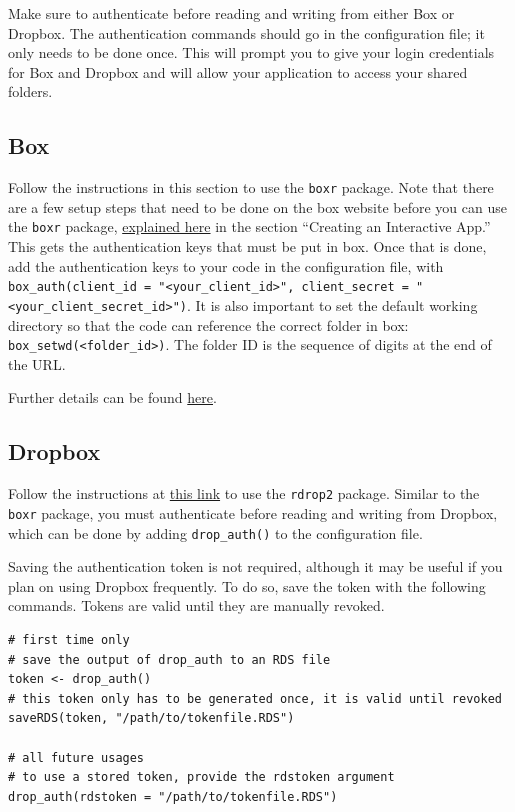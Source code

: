 \documentclass[
]{book}
\begin{document}
Make sure to authenticate before reading and writing from either Box or Dropbox. The authentication commands should go in the configuration file; it only needs to be done once. This will prompt you to give your login credentials for Box and Dropbox and will allow your application to access your shared folders.

\subsection{Box}\label{box}

Follow the instructions in this section to use the \texttt{boxr} package. Note that there are a few setup steps that need to be done on the box website before you can use the \texttt{boxr} package, \href{https://r-box.github.io/boxr/articles/boxr-app-interactive.html\#create}{explained here} in the section ``Creating an Interactive App.'' This gets the authentication keys that must be put in box.
Once that is done, add the authentication keys to your code in the configuration file, with \texttt{box\_auth(client\_id\ =\ "\textless{}your\_client\_id\textgreater{}",\ client\_secret\ =\ "\textless{}your\_client\_secret\_id\textgreater{}")}. It is also important to set the default working directory so that the code can reference the correct folder in box: \texttt{box\_setwd(\textless{}folder\_id\textgreater{})}. The folder ID is the sequence of digits at the end of the URL.

Further details can be found \href{https://github.com/r-box/boxr}{here}.

\subsection{Dropbox}\label{dropbox}

Follow the instructions at \href{https://github.com/karthik/rdrop2}{this link} to use the \texttt{rdrop2} package. Similar to the \texttt{boxr} package, you must authenticate before reading and writing from Dropbox, which can be done by adding \texttt{drop\_auth()} to the configuration file.

Saving the authentication token is not required, although it may be useful if you plan on using Dropbox frequently. To do so, save the token with the following commands. Tokens are valid until they are manually revoked.

\begin{verbatim}
# first time only
# save the output of drop_auth to an RDS file
token <- drop_auth()
# this token only has to be generated once, it is valid until revoked
saveRDS(token, "/path/to/tokenfile.RDS")

# all future usages
# to use a stored token, provide the rdstoken argument
drop_auth(rdstoken = "/path/to/tokenfile.RDS")
\end{verbatim}
\end{document}

